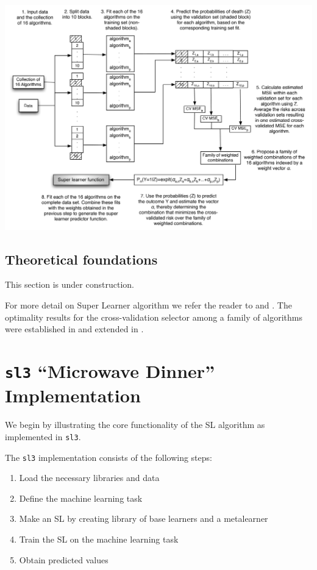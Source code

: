 \documentclass[
  12pt, krantz2,
]{krantz}
\newcommand{\passthrough}[1]{#1}
\providecommand{\tightlist}{%
  \setlength{\itemsep}{0pt}\setlength{\parskip}{0pt}}
\theoremstyle{definition}
\theoremstyle{definition}
\theoremstyle{definition}
\newcommand{\1}{\mathbbm{1}}
\begin{document}
\begin{center}\includegraphics[width=0.8\linewidth]{img/png/SLKaiserNew} \end{center}

\hypertarget{sl3-theory}{%
\subsection{Theoretical foundations}\label{sl3-theory}}

This section is under construction.

For more detail on Super Learner algorithm we refer the reader to
\citet{polley2010super} and \citet{vdl2007super}. The optimality results for the
cross-validation selector among a family of algorithms were established in
\citet{vdl2003unified} and extended in \citet{vaart2006oracle}.

\hypertarget{sl3-microwave-dinner-implementation}{%
\section*{\texorpdfstring{\texttt{sl3} ``Microwave Dinner'' Implementation}{sl3 ``Microwave Dinner'' Implementation}}\label{sl3-microwave-dinner-implementation}}


We begin by illustrating the core functionality of the SL algorithm as
implemented in \passthrough{\lstinline!sl3!}.

The \passthrough{\lstinline!sl3!} implementation consists of the following steps:

\begin{enumerate}
\def\labelenumi{\arabic{enumi}.}
\setcounter{enumi}{-1}
\tightlist
\item
  Load the necessary libraries and data
\item
  Define the machine learning task
\item
  Make an SL by creating library of base learners and a metalearner
\item
  Train the SL on the machine learning task
\item
  Obtain predicted values
\end{enumerate}
\end{document}
